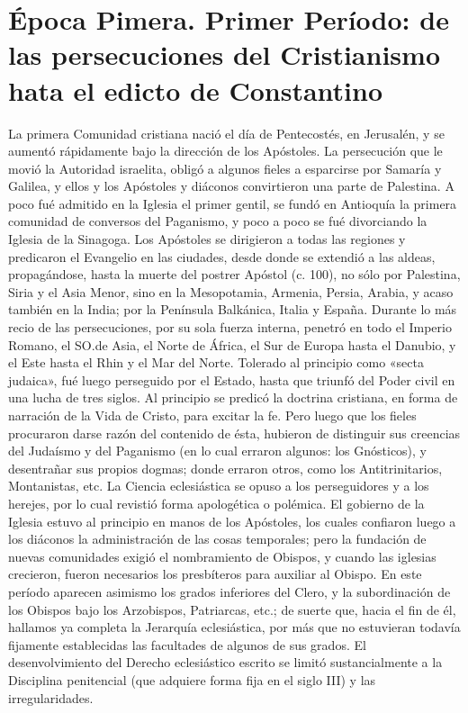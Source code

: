 \raggedbottom{} \documentclass[12pt, a4paper, openany]{book} %
\begin{document}
\part{Época Pimera. Primer Período: de las persecuciones del Cristianismo hata el edicto de Constantino}
La primera Comunidad cristiana nació el día de Pentecostés, en Jerusalén, y se aumentó rápidamente bajo la dirección de los Apóstoles. La persecución que le movió la Autoridad israelita, obligó a algunos fieles a esparcirse por Samaría y Galilea, y ellos y los Apóstoles y diáconos convirtieron una parte de Palestina. A poco fué admitido en la Iglesia el primer gentil, se fundó en Antioquía la primera comunidad de conversos del Paganismo, y poco a poco se fué divorciando la Iglesia de la Sinagoga. Los Apóstoles se dirigieron a todas las regiones y predicaron el Evangelio en las ciudades, desde donde se extendió a las aldeas, propagándose, hasta la muerte del postrer Apóstol (c. 100), no sólo por Palestina, Siria y el Asia Menor, sino en la Mesopotamia, Armenia, Persia, Arabia, y acaso también en la India; por la Península Balkánica, Italia y España. Durante lo más recio de las persecuciones, por su sola fuerza interna, penetró en todo el Imperio Romano, el SO.\@ de Asia, el Norte de África, el Sur de Europa hasta el Danubio, y el Este hasta el Rhin y el Mar del Norte. Tolerado al principio como «secta judaica», fué luego perseguido por el Estado, hasta que triunfó del Poder civil en una lucha de tres siglos. Al principio se predicó la doctrina cristiana, en forma de narración de la Vida de Cristo, para excitar la fe. Pero luego que los fieles procuraron darse razón del contenido de ésta, hubieron de distinguir sus creencias del Judaísmo y del Paganismo (en lo cual erraron algunos: los Gnósticos), y desentrañar sus propios dogmas; donde erraron otros, como los Antitrinitarios, Montanistas, etc. La Ciencia eclesiástica se opuso a los perseguidores y a los herejes, por lo cual revistió forma apologética o polémica. El gobierno de la Iglesia estuvo al principio en manos de los Apóstoles, los cuales confiaron luego a los diáconos la administración de las cosas temporales; pero la fundación de nuevas comunidades exigió el nombramiento de Obispos, y cuando las iglesias crecieron, fueron necesarios los presbíteros para auxiliar al Obispo. En este período aparecen asimismo los grados inferiores del Clero, y la subordinación de los Obispos bajo los Arzobispos, Patriarcas, etc.; de suerte que, hacia el fin de él, hallamos ya completa la Jerarquía eclesiástica, por más que no estuvieran todavía fijamente establecidas las facultades de algunos de sus grados. El desenvolvimiento del Derecho eclesiástico escrito se limitó sustancialmente a la Disciplina penitencial (que adquiere forma fija en el siglo III) y las irregularidades.
\end{document}
